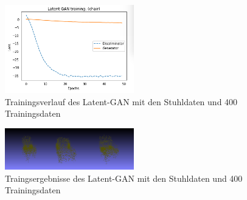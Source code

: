 \documentclass{llncs}
\begin{document}
\begin{figure}[htbp] 
	\centering
	\includegraphics[width=0.5\textwidth]{raw_gan_latent_gan_chair_result_400_example.png}
	\caption{Trainingsverlauf des Latent-GAN mit den Stuhldaten und 400 Trainingsdaten}
	\label{fig:Bild65}
\end{figure}

\begin{figure}[htbp] 
	\centering
	\includegraphics[width=0.5\textwidth]{raw_gan_latent_gan_chair_example_400.png}
	\caption{Traingsergebnisse des Latent-GAN mit den Stuhldaten und 400 Trainingsdaten}
	\label{fig:Bild66}
\end{figure}
\end{document}

